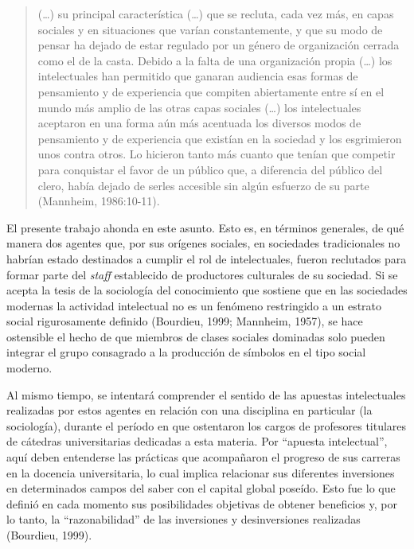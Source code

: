 \begin{quote}
(\dots) su principal característica (\dots) que se recluta, cada vez más, en capas sociales y en situaciones que varían constantemente, y que su modo de pensar ha dejado de estar regulado por un género de organización cerrada como el de la casta. Debido a la falta de una organización propia (\dots) los intelectuales han permitido que ganaran audiencia esas formas de pensamiento y de experiencia que compiten abiertamente entre sí en el mundo más amplio de las otras capas sociales (\dots) los intelectuales aceptaron en una forma aún más acentuada los diversos modos de pensamiento y de experiencia que existían en la sociedad y los esgrimieron unos contra otros. Lo hicieron tanto más cuanto que tenían que competir para conquistar el favor de un público que, a diferencia del público del clero, había dejado de serles accesible sin algún esfuerzo de su parte (Mannheim, 1986:10-11).
\end{quote}

El presente trabajo ahonda en este asunto. Esto es, en términos generales, de qué manera dos agentes que, por sus orígenes sociales, en sociedades tradicionales no habrían estado destinados a cumplir el rol de intelectuales, fueron reclutados para formar parte del \emph{staff} establecido de productores culturales de su sociedad. Si se acepta la tesis de la sociología del conocimiento que sostiene que en las sociedades modernas la actividad intelectual no es un fenómeno restringido a un estrato social rigurosamente definido \parencite{1513-SHILS1976,1521-BAUMAN1997}(Bourdieu, 1999; Mannheim, 1957), se hace ostensible el hecho de que miembros de clases sociales dominadas solo pueden integrar el grupo consagrado a la producción de símbolos en el tipo social moderno.

Al mismo tiempo, se intentará comprender el sentido de las apuestas intelectuales realizadas por estos agentes en relación con una disciplina en particular (la sociología), durante el período en que ostentaron los cargos de profesores titulares de cátedras universitarias dedicadas a esta materia. Por \enquote{apuesta intelectual}, aquí deben entenderse las prácticas que acompañaron el progreso de sus carreras en la docencia universitaria, lo cual implica relacionar sus diferentes inversiones en determinados campos del saber con el capital global poseído. Esto fue lo que definió en cada momento sus posibilidades objetivas de obtener beneficios y, por lo tanto, la \enquote{razonabilidad} de las inversiones y desinversiones realizadas (Bourdieu, 1999).


